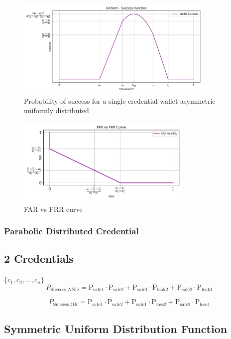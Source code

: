 \documentclass{article}
\begin{document}
\begin{figure}[H]
    \centering
    \includegraphics[width=0.85\textwidth]{fig_success_uniform.pdf}
    \caption{Probability of success for a single credential wallet asymmetric uniformly distributed}
\end{figure}
\begin{figure}[H]
    \centering
    \includegraphics[width=0.75\textwidth]{fig_FARvFRR_uniform.pdf}
    \caption{FAR vs FRR curve}
\end{figure}

\subsubsection{Parabolic Distributed Credential}

\subsection{2 Credentials}
$\{c_1, c_2, \ldots, c_n\}$
\[
P_{\text{Success\_AND}} = \mathrm{P_{\text{safe1}}} \cdot \mathrm{P_{\text{safe2}}} + \mathrm{P_{\text{safe1}}} \cdot \mathrm{P_{\text{leak2}}} + \mathrm{P_{\text{safe2}}} \cdot \mathrm{P_{\text{leak1}}}
\]

\[
P_{\text{Success\_OR}} = \mathrm{P_{\text{safe1}}} \cdot \mathrm{P_{\text{safe2}}} + \mathrm{P_{\text{safe1}}} \cdot \mathrm{P_{\text{loss2}}} + \mathrm{P_{\text{safe2}}} \cdot \mathrm{P_{\text{loss1}}}
\]
\subsection{Symmetric Uniform Distribution Function}
\end{document}
